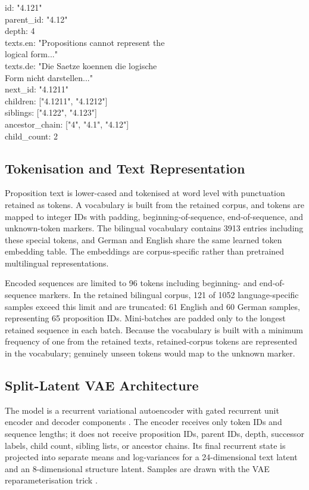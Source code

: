 \documentclass[webpdf,modern,medium,namedate]{oup-authoring-template}
\begin{document}
\begin{center}
\begin{minipage}{0.96\columnwidth}
\footnotesize\ttfamily
\setlength{\parindent}{0pt}
id: "4.121"\\
parent\_id: "4.12"\\
depth: 4\\
texts.en: "Propositions cannot represent the\\
\hspace*{1.5em}logical form..."\\
texts.de: "Die Saetze koennen die logische\\
\hspace*{1.5em}Form nicht darstellen..."\\
next\_id: "4.1211"\\
children: ["4.1211", "4.1212"]\\
siblings: ["4.122", "4.123"]\\
ancestor\_chain: ["4", "4.1", "4.12"]\\
child\_count: 2
\end{minipage}
\end{center}

\subsection{Tokenisation and Text Representation}
Proposition text is lower-cased and tokenised at word level with punctuation retained as tokens. A vocabulary is built from the retained corpus, and tokens are mapped to integer IDs with padding, beginning-of-sequence, end-of-sequence, and unknown-token markers. The bilingual vocabulary contains 3913 entries including these special tokens, and German and English share the same learned token embedding table. The embeddings are corpus-specific rather than pretrained multilingual representations.

Encoded sequences are limited to 96 tokens including beginning- and end-of-sequence markers. In the retained bilingual corpus, 121 of 1052 language-specific samples exceed this limit and are truncated: 61 English and 60 German samples, representing 65 proposition IDs. Mini-batches are padded only to the longest retained sequence in each batch. Because the vocabulary is built with a minimum frequency of one from the retained texts, retained-corpus tokens are represented in the vocabulary; genuinely unseen tokens would map to the unknown marker.

\subsection{Split-Latent VAE Architecture}
The model is a recurrent variational autoencoder with gated recurrent unit encoder and decoder components \citep{cho2014learning}. The encoder receives only token IDs and sequence lengths; it does not receive proposition IDs, parent IDs, depth, successor labels, child count, sibling lists, or ancestor chains. Its final recurrent state is projected into separate means and log-variances for a 24-dimensional text latent and an 8-dimensional structure latent. Samples are drawn with the VAE reparameterisation trick \citep{kingma2014autoencoding}.
\end{document}

